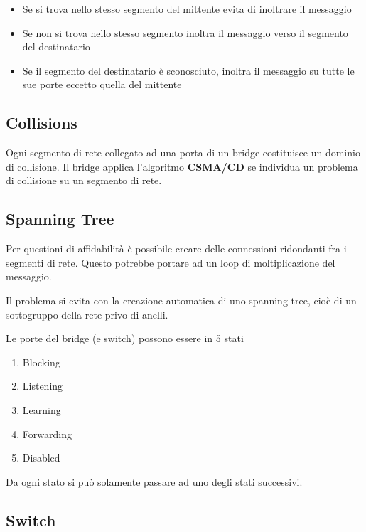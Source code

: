 \documentclass{article}
\begin{document}
\begin{itemize}
    \item Se si trova nello stesso segmento del mittente evita di inoltrare il messaggio
    \item Se non si trova nello stesso segmento inoltra il messaggio verso il segmento del destinatario
    \item Se il segmento del destinatario è sconosciuto, inoltra il messaggio su tutte le sue porte eccetto
        quella del mittente
\end{itemize}

\pagebreak

\subsection{Collisions}

Ogni segmento di rete collegato ad una porta di un bridge costituisce un dominio di collisione.
Il bridge applica l'algoritmo \textbf{CSMA/CD} se individua un problema di collisione su un segmento di rete.

\subsection{Spanning Tree}

Per questioni di affidabilità è possibile creare delle connessioni ridondanti fra i segmenti di rete.
Questo potrebbe portare ad un loop di moltiplicazione del messaggio.

Il problema si evita con la creazione automatica di uno spanning tree, cioè di un sottogruppo della
rete privo di anelli.

Le porte del bridge (e switch) possono essere in 5 stati

\begin{enumerate}
    \item Blocking
    \item Listening
    \item Learning
    \item Forwarding
    \item Disabled
\end{enumerate}

Da ogni stato si può solamente passare ad uno degli stati successivi.

\subsection{Switch}
\end{document}
